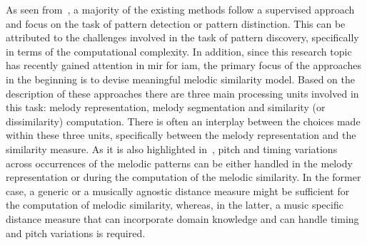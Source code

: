 As seen from~, a majority of the existing methods follow a supervised approach and focus on the task of pattern detection or pattern distinction. This can be attributed to the challenges involved in the task of pattern discovery, specifically in terms of the computational complexity. In addition, since this research topic has recently gained attention in \gls{mir} for \gls{iam}, the primary focus of the approaches in the beginning is to devise meaningful melodic similarity model. Based on the description of these approaches there are three main processing units involved in this task: melody representation, melody segmentation and similarity (or dissimilarity) computation. There is often an interplay between the choices made within these three units, specifically between the melody representation and the similarity measure. As it is also highlighted in~\cite{gomez2003melody}, pitch and timing variations across occurrences of the melodic patterns can be either handled in the melody representation or during the computation of the melodic similarity. In the former case, a generic or a musically agnostic distance measure might be sufficient for the computation of melodic similarity, whereas, in the latter, a music specific distance measure that can incorporate domain knowledge and can handle timing and pitch variations is required. 

